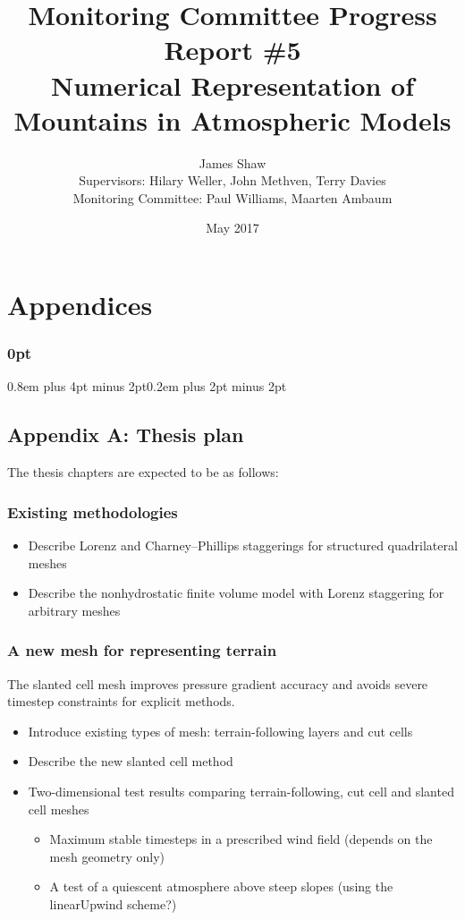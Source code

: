 \documentclass[a4paper,11pt]{article}
\title{
\vspace*{-2em}
Monitoring Committee Progress Report \#5\\
\vspace*{1em}
\Large{Numerical Representation of Mountains in Atmospheric Models}}
\author{James Shaw
\vspace{0.5em} \\
\large{Supervisors: Hilary Weller, John Methven, Terry Davies}
\vspace{0.5em} \\
\large{Monitoring Committee: Paul Williams, Maarten Ambaum}}
\date{May 2017}
\begin{document}
\maketitle


                                                 


\newpage

\section*{Appendices}

\titlespacing\subsubsection{0pt}{0.8em plus 4pt minus 2pt}{0.2em plus 2pt minus 2pt}

\subsection*{Appendix A: Thesis plan}
The thesis chapters are expected to be as follows:

\subsubsection*{Existing methodologies}
\begin{itemize}[itemsep=0.1em]
	\item Describe Lorenz and Charney--Phillips staggerings for structured quadrilateral meshes
	\item Describe the nonhydrostatic finite volume model with Lorenz staggering for arbitrary meshes \citep{weller-shahrokhi2014}
\end{itemize}

\subsubsection*{A new mesh for representing terrain}
\noindent The slanted cell mesh improves pressure gradient accuracy and avoids severe timestep constraints for explicit methods.
\begin{itemize}[itemsep=0.1em]
	\item Introduce existing types of mesh: terrain-following layers and cut cells
	\item Describe the new slanted cell method
	\item {Two-dimensional test results comparing terrain-following, cut cell and slanted cell meshes
	\begin{itemize}[itemsep=0.1em,topsep=0pt]
		\item Maximum stable timesteps in a prescribed wind field (depends on the mesh geometry only)
		\item A test of a quiescent atmosphere above steep slopes (using the linearUpwind scheme?)
	\end{itemize}}
\end{itemize}
\end{document}
